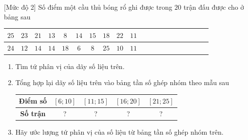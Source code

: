 \begin{bt}%
[Mức độ 2]%
	Số điểm một cầu thủ bóng rổ ghi được trong $ 20 $ trận đấu được cho ở bảng sau
	\begin{center}
		\begin{tabular}{|c|c|c|c|c|c|c|c|c|c|c|c|c|c|c|c|c|c|c|c|}
			\hline 
			$ 25 $	& $ 23 $ & $ 21 $ & $ 13 $ & $ 8 $ & $ 14 $ & $ 15 $ & $ 18 $ & $ 22 $ & $ 11 $\\ 
			\hline 
			$ 24 $	& $ 12 $ & $ 14 $ & $ 14 $ & $ 18 $ & $ 6 $ & $ 8 $ & $ 25 $ & $ 10 $ & $ 11 $ \\ 
			\hline 
		\end{tabular} 
	\end{center}
	\begin{enumerate}
		\item Tìm tứ phân vị của dãy số liệu trên.
		\item Tổng hợp lại dãy số liệu trên vào bảng tần số ghép nhóm theo mẫu sau
		\begin{center}
			\begin{tabular}{|c|c|c|c|c|}
				\hline 
				\textbf{Điểm số}	& $\left[ 6;10\right] $ & $\left[ 11;15\right] $ & $\left[16;20\right] $ & $\left[ 21;25\right] $\\ 
				\hline 
				\textbf{Số trận}	& ? & ? & ? & ?\\ 
				\hline 
			\end{tabular} 
		\end{center}
		\item Hãy ước lượng tứ phân vị của số liệu từ bảng tần số ghép nhóm trên.
	\end{enumerate}
\end{bt}
